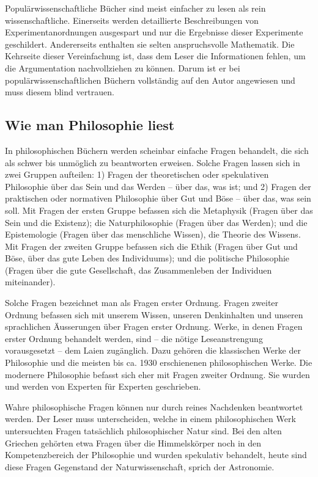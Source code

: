 \documentclass[a4paper,11pt]{scrartcl}
\begin{document}
Populärwissenschaftliche Bücher sind meist einfacher zu lesen als rein wissenschaftliche. Einerseits werden detaillierte Beschreibungen von Experimentanordnungen ausgespart und nur die Ergebnisse dieser Experimente geschildert. Andererseits enthalten sie selten anspruchsvolle Mathematik. Die Kehrseite dieser Vereinfachung ist, dass dem Leser die Informationen fehlen, um die Argumentation nachvollziehen zu können. Darum ist er bei populärwissenschaftlichen Büchern vollständig auf den Autor angewiesen und muss diesem blind vertrauen.

\subsection{Wie man Philosophie liest}

In philosophischen Büchern werden scheinbar einfache Fragen behandelt, die sich als schwer bis unmöglich zu beantworten erweisen. Solche Fragen lassen sich in zwei Gruppen aufteilen: 1) Fragen der theoretischen oder spekulativen Philosophie über das Sein und das Werden – über das, was ist; und 2) Fragen der praktischen oder normativen Philosophie über Gut und Böse – über das, was sein soll. Mit Fragen der ersten Gruppe befassen sich die Metaphysik (Fragen über das Sein und die Existenz); die Naturphilosophie (Fragen über das Werden); und die Epistemologie (Fragen über das menschliche Wissen), die Theorie des Wissens. Mit Fragen der zweiten Gruppe befassen sich die Ethik (Fragen über Gut und Böse, über das gute Leben des Individuums); und die politische Philosophie (Fragen über die gute Gesellschaft, das Zusammenleben der Individuen miteinander).

Solche Fragen bezeichnet man als Fragen erster Ordnung. Fragen zweiter Ordnung befassen sich mit unserem Wissen, unseren Denkinhalten und unseren sprachlichen Äusserungen über Fragen erster Ordnung. Werke, in denen Fragen erster Ordnung behandelt werden, sind – die nötige Leseanstrengung vorausgesetzt – dem Laien zugänglich. Dazu gehören die klassischen Werke der Philosophie und die meisten bis ca. 1930 erschienenen philosophischen Werke. Die modernere Philosophie befasst sich eher mit Fragen zweiter Ordnung. Sie wurden und werden von Experten für Experten geschrieben.

Wahre philosophische Fragen können nur durch reines Nachdenken beantwortet werden. Der Leser muss unterscheiden, welche in einem philosophischen Werk untersuchten Fragen tatsächlich philosophischer Natur sind. Bei den alten Griechen gehörten etwa Fragen über die Himmelskörper noch in den Kompetenzbereich der Philosophie und wurden spekulativ behandelt, heute sind diese Fragen Gegenstand der Naturwissenschaft, sprich der Astronomie.
\end{document}
